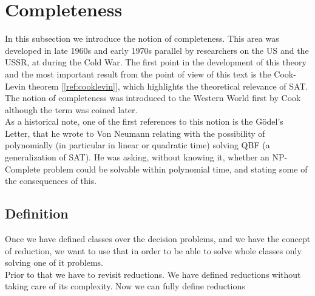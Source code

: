 \section{Completeness}

In this subsection we introduce the notion of completeness. This area was developed in late 1960s and early 1970s parallel by researchers on the US and the USSR, at during the Cold War. The first point in the development  of this theory and the most important result from the point of view of this text is the Cook-Levin theorem [\ref{ref:cooklevin}], which highlights the theoretical relevance of SAT. The notion of completeness was introduced to the Western World first by Cook \cite{cook1971complexity} although the term was coined later. \\

As a historical note, one of the first references to this notion is the Gödel's Letter\cite{hartmanis1993godel}, that he wrote to Von Neumann relating with the possibility of polynomially (in particular in linear or quadratic time) solving QBF (a generalization of SAT). He was asking, without knowing it, whether an NP-Complete problem could be solvable within polynomial time, and stating some of the consequences of this.\\



\subsection{Definition}

Once we have defined classes over the decision problems, and we have the concept of reduction, we want to use that in order to be able to solve whole classes only solving one of it problems.\\

Prior to that we have to revisit reductions. We have defined reductions without taking care of its complexity. Now we can fully define reductions



